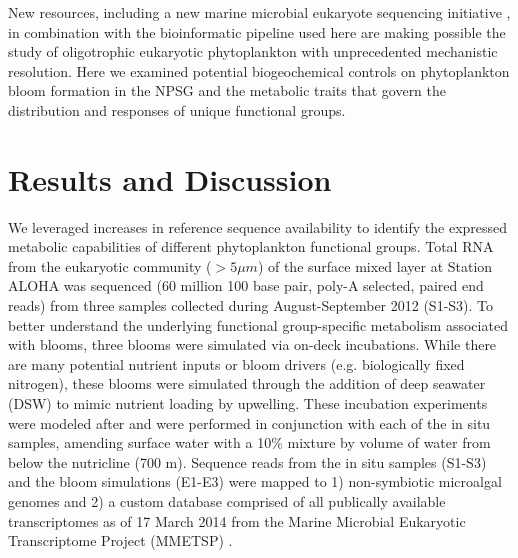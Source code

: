 New resources, including a new marine microbial eukaryote sequencing initiative \citep{Keeling2014}, in combination with the bioinformatic pipeline used here are making possible the study of oligotrophic eukaryotic phytoplankton with unprecedented mechanistic resolution. Here we examined potential biogeochemical controls on phytoplankton bloom formation in the NPSG and the metabolic traits that govern the distribution and responses of unique functional groups. \par
\section{Results and Discussion}
We leveraged increases in reference sequence availability \citep{Keeling2014} to identify the expressed metabolic capabilities of different phytoplankton functional groups. Total RNA from the eukaryotic community ($>5 \mu m$) of the surface mixed layer at Station ALOHA was sequenced (60 million 100 base pair, poly-A selected, paired end reads) from three samples collected during August-September 2012 (S1-S3). To better understand the underlying functional group-specific metabolism associated with blooms, three blooms were simulated via on-deck incubations. While there are many potential nutrient inputs or bloom drivers (e.g. biologically fixed nitrogen), these blooms were simulated through the addition of deep seawater (DSW) to mimic nutrient loading by upwelling.  These incubation experiments were modeled after \citet{McAndrew2007} and were performed in conjunction with each of the in situ samples, amending surface water with a 10\% mixture by volume of water from below the nutricline (700 m). Sequence reads from the in situ samples (S1-S3) and the bloom simulations (E1-E3) were mapped to 1) non-symbiotic microalgal genomes and 2) a custom database comprised of all publically available transcriptomes as of 17 March 2014 from the Marine Microbial Eukaryotic Transcriptome Project (MMETSP) \citep{Keeling2014}.\par 

